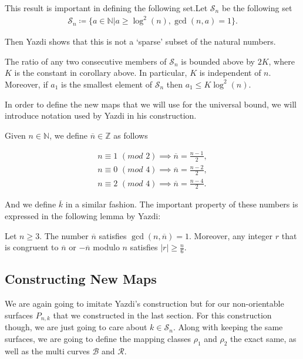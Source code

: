This result is important in defining the following set.Let $\mathcal{S}_n$ be the following set
\begin{align*}
    \mathcal{S}_n \coloneqq \{a \in \mathbb{N} \vert a \geq \log^2(n), \gcd(n,a) = 1\}.
\end{align*}

Then Yazdi shows that this is not a `sparse' subset of the natural numbers.

\begin{lem}[Yazdi]
The ratio of any two consecutive members of $\mathcal{S}_n$ is bounded above by $2K$, where $K$ is the constant in corollary above. In particular, $K$ is independent of $n$. Moreover, if $a_1$ is the smallest element of $\mathcal{S}_n$ then $a_1 \leq K\log^2(n)$.
\end{lem}

In order to define the new maps that we will use for the universal bound, we will introduce notation used by Yazdi in his construction.

Given $n \in \mathbb{N}$, we define $\overline{n} \in \mathbb{Z}$ as follows

\begin{gather*}
    n \equiv 1 \,\,(mod  \,\,2) \implies \overline{n} = \frac{n-1}{2}, \\
    n \equiv 0 \,\,(mod  \,\,4) \implies \overline{n} = \frac{n-2}{2}, \\
    n \equiv 2 \,\,(mod  \,\,4) \implies \overline{n} = \frac{n-4}{2}.
\end{gather*}

And we define $\overline{k}$ in a similar fashion. The important property of these numbers is expressed in the following lemma by Yazdi:

\begin{lem}[Yazdi]
Let $n \geq 3$. The number $\overline{n}$ satisfies $\gcd(n,\overline{n}) = 1$. Moreover, any integer $r$ that is congruent to $\overline{n}$ or $-\overline{n}$ modulo $n$ satisfies $|r| \geq \frac{n}{6}$.
\end{lem}

\subsection{Constructing New Maps}

We are again going to imitate Yazdi's construction but for our non-orientable surfaces $P_{n,k}$ that we constructed in the last section. For this construction though, we are just going to care about $k \in \mathcal{S}_n$. Along with keeping the same surfaces, we are going to define the mapping classes $\rho_1$ and $\rho_2$ the exact same, as well as the multi curves $\mathcal{B}$ and $\mathcal{R}$. 

